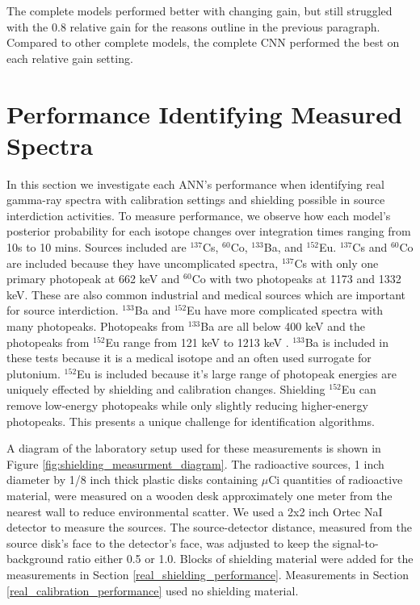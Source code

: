 The complete models performed better with changing gain, but still struggled with the 0.8 relative gain for the reasons outline in the previous paragraph. Compared to other complete models, the complete CNN performed the best on each relative gain setting.

\section{Performance Identifying Measured Spectra} \label{real_spectra_performance}

In this section we investigate each ANN's performance when identifying real gamma-ray spectra with calibration settings and shielding possible in source interdiction activities. To measure performance, we observe how each model's posterior probability for each isotope changes over integration times ranging from 10s to 10 mins. Sources included are $^{137}$Cs, $^{60}$Co, $^{133}$Ba, and $^{152}$Eu. $^{137}$Cs and $^{60}$Co are included because they have uncomplicated spectra, $^{137}$Cs with only one primary photopeak at 662 keV and $^{60}$Co with two photopeaks at 1173 and 1332 keV. These are also common industrial and medical sources which are important for source interdiction. $^{133}$Ba and $^{152}$Eu have more complicated spectra with many photopeaks. Photopeaks from $^{133}$Ba are all below 400 keV and the photopeaks from $^{152}$Eu range from 121 keV to 1213 keV \cite{bigbluebook}. $^{133}$Ba is included in these tests because it is a medical isotope and an often used surrogate for plutonium. $^{152}$Eu is included because it's large range of photopeak energies are uniquely effected by shielding and calibration changes. Shielding $^{152}$Eu can remove low-energy photopeaks while only slightly reducing higher-energy photopeaks. This presents a unique challenge for identification algorithms.

A diagram of the laboratory setup used for these measurements is shown in Figure \ref{fig:shielding_measurment_diagram}. The radioactive sources, 1 inch diameter by 1/8 inch thick plastic disks containing $\mu$Ci quantities of radioactive material, were measured on a wooden desk approximately one meter from the nearest wall to reduce environmental scatter. We used a 2x2 inch Ortec NaI detector to measure the sources. The source-detector distance, measured from the source disk's face to the detector's face, was adjusted to keep the signal-to-background ratio either 0.5 or 1.0. Blocks of shielding material were added for the measurements in Section \ref{real_shielding_performance}. Measurements in Section \ref{real_calibration_performance} used no shielding material. 

